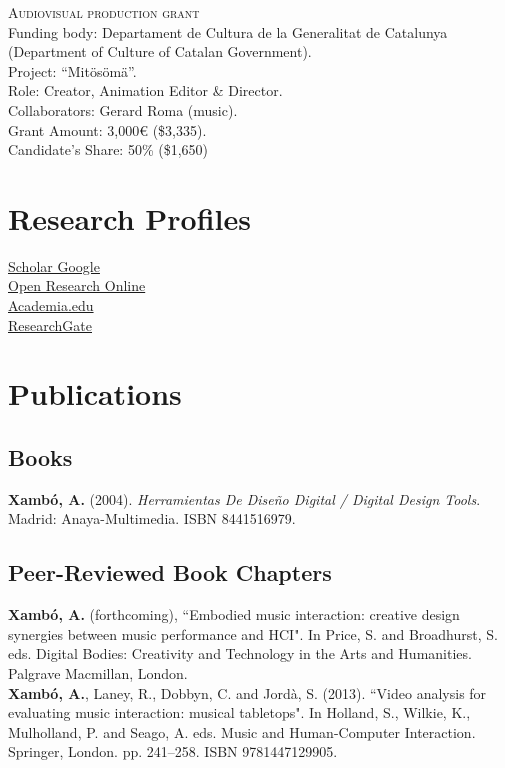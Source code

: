 \documentclass[10pt, a4paper]{article}
\newcommand{\years}[1]{\marginnote{\scriptsize #1}}
\begin{document}
\years{09/1998--08/1999}\textsc{Audiovisual production grant} \\
Funding body: Departament de Cultura de la Generalitat de Catalunya (Department of Culture of Catalan Government).\\
Project: ``Mitösömä''.  \\
Role: Creator, Animation Editor \& Director.\\
Collaborators: Gerard Roma (music). \\
Grant Amount: 3,000€ (\$3,335). \\
Candidate’s Share: 50\% (\$1,650)  



\section*{Research Profiles}
\noindent

\textbullet \- \href{https://scholar.google.com/citations?user=yi3WXM8AAAAJ}{Scholar Google}\\
\textbullet \- \href{http://oro.open.ac.uk/view/person/ax22.html}{Open Research Online}\\
\textbullet \- \href{http://open.academia.edu/AnnaXambo}{Academia.edu}\\
\textbullet \- \href{http://www.researchgate.net/profile/Anna_Xambo}{ResearchGate}\\

\section*{Publications}
\noindent

\subsection*{Books}
\noindent
\years{2004}\textbf{Xambó, A.} (2004). \emph{Herramientas De Diseño Digital / Digital Design Tools}. Madrid: Anaya-Multimedia. ISBN 8441516979.

\subsection*{Peer-Reviewed Book Chapters}
\noindent
\years{2016}\textbf{Xambó, A.} (forthcoming), “Embodied music interaction: creative design synergies between music performance and HCI". In Price, S. and Broadhurst, S. eds. Digital Bodies: Creativity and Technology in the Arts and Humanities. Palgrave Macmillan, London.\\
\years{2013}\textbf{Xambó, A.}, Laney, R., Dobbyn, C. and Jordà, S. (2013). “Video analysis for evaluating music interaction: musical tabletops". In Holland, S., Wilkie, K., Mulholland, P. and Seago, A. eds. Music and Human-Computer Interaction. Springer, London. pp. 241--258. ISBN 9781447129905.
\end{document}

